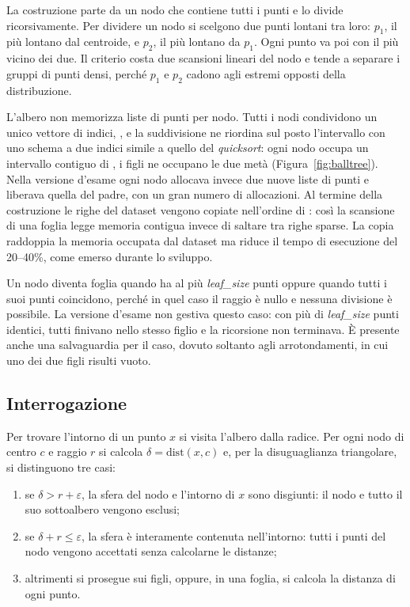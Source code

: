 La costruzione parte da un nodo che contiene tutti i punti e lo divide ricorsivamente. Per dividere un nodo si scelgono due punti lontani tra loro: $p_1$, il più lontano dal centroide, e $p_2$, il più lontano da $p_1$. Ogni punto va poi con il più vicino dei due. Il criterio costa due scansioni lineari del nodo e tende a separare i gruppi di punti densi, perché $p_1$ e $p_2$ cadono agli estremi opposti della distribuzione.

L'albero non memorizza liste di punti per nodo. Tutti i nodi condividono un unico vettore di indici, , e la suddivisione ne riordina sul posto l'intervallo con uno schema a due indici simile a quello del \emph{quicksort}: ogni nodo occupa un intervallo contiguo \codice{[start, end)} di , i figli ne occupano le due metà (Figura~\ref{fig:balltree}). Nella versione d'esame ogni nodo allocava invece due nuove liste di punti e liberava quella del padre, con un gran numero di allocazioni. Al termine della costruzione le righe del dataset vengono copiate nell'ordine di : così la scansione di una foglia legge memoria contigua invece di saltare tra righe sparse. La copia raddoppia la memoria occupata dal dataset ma riduce il tempo di esecuzione del 20--40\%, come emerso durante lo sviluppo.

Un nodo diventa foglia quando ha al più \textit{leaf\_size} punti oppure quando tutti i suoi punti coincidono, perché in quel caso il raggio è nullo e nessuna divisione è possibile. La versione d'esame non gestiva questo caso: con più di \textit{leaf\_size} punti identici, tutti finivano nello stesso figlio e la ricorsione non terminava. È presente anche una salvaguardia per il caso, dovuto soltanto agli arrotondamenti, in cui uno dei due figli risulti vuoto.

\subsection*{Interrogazione}

Per trovare l'intorno di un punto $x$ si visita l'albero dalla radice. Per ogni nodo di centro $c$ e raggio $r$ si calcola $\delta = \mathrm{dist}(x, c)$ e, per la disuguaglianza triangolare, si distinguono tre casi:

\begin{enumerate}
    \item se $\delta > r + \varepsilon$, la sfera del nodo e l'intorno di $x$ sono disgiunti: il nodo e tutto il suo sottoalbero vengono esclusi;
    \item se $\delta + r \le \varepsilon$, la sfera è interamente contenuta nell'intorno: tutti i punti del nodo vengono accettati senza calcolarne le distanze;
    \item altrimenti si prosegue sui figli, oppure, in una foglia, si calcola la distanza di ogni punto.
\end{enumerate}

